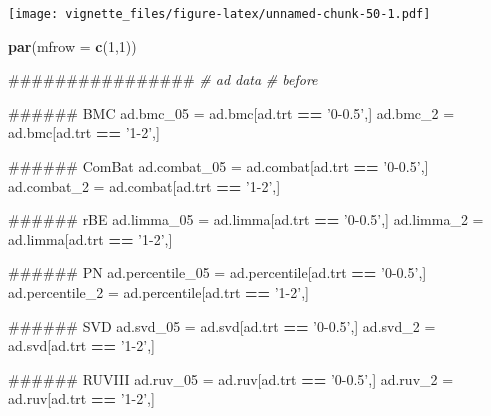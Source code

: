 \documentclass[]{book}
\newenvironment{Shaded}{\begin{snugshade}}{\end{snugshade}}
\newcommand{\KeywordTok}[1]{\textcolor[rgb]{0.13,0.29,0.53}{\textbf{#1}}}
\newcommand{\DataTypeTok}[1]{\textcolor[rgb]{0.13,0.29,0.53}{#1}}
\newcommand{\DecValTok}[1]{\textcolor[rgb]{0.00,0.00,0.81}{#1}}
\newcommand{\StringTok}[1]{\textcolor[rgb]{0.31,0.60,0.02}{#1}}
\newcommand{\CommentTok}[1]{\textcolor[rgb]{0.56,0.35,0.01}{\textit{#1}}}
\newcommand{\OperatorTok}[1]{\textcolor[rgb]{0.81,0.36,0.00}{\textbf{#1}}}
\newcommand{\NormalTok}[1]{#1}
\begin{document}
\texttt{[image: vignette\_files/figure-latex/unnamed-chunk-50-1.pdf]}

\begin{Shaded}
\begin{Highlighting}[]
\KeywordTok{par}\NormalTok{(}\DataTypeTok{mfrow =} \KeywordTok{c}\NormalTok{(}\DecValTok{1}\NormalTok{,}\DecValTok{1}\NormalTok{))}
\end{Highlighting}
\end{Shaded}

\begin{Shaded}
\begin{Highlighting}[]
\NormalTok{################}
\CommentTok{# ad data}
\CommentTok{# before}

\NormalTok{###### BMC}
\NormalTok{ad.bmc_}\DecValTok{05}\NormalTok{ =}\StringTok{ }\NormalTok{ad.bmc[ad.trt }\OperatorTok{==}\StringTok{ '0-0.5'}\NormalTok{,]}
\NormalTok{ad.bmc_}\DecValTok{2}\NormalTok{ =}\StringTok{ }\NormalTok{ad.bmc[ad.trt }\OperatorTok{==}\StringTok{ '1-2'}\NormalTok{,]}

\NormalTok{###### ComBat}
\NormalTok{ad.combat_}\DecValTok{05}\NormalTok{ =}\StringTok{ }\NormalTok{ad.combat[ad.trt }\OperatorTok{==}\StringTok{ '0-0.5'}\NormalTok{,]}
\NormalTok{ad.combat_}\DecValTok{2}\NormalTok{ =}\StringTok{ }\NormalTok{ad.combat[ad.trt }\OperatorTok{==}\StringTok{ '1-2'}\NormalTok{,]}

\NormalTok{###### rBE}
\NormalTok{ad.limma_}\DecValTok{05}\NormalTok{ =}\StringTok{ }\NormalTok{ad.limma[ad.trt }\OperatorTok{==}\StringTok{ '0-0.5'}\NormalTok{,]}
\NormalTok{ad.limma_}\DecValTok{2}\NormalTok{ =}\StringTok{ }\NormalTok{ad.limma[ad.trt }\OperatorTok{==}\StringTok{ '1-2'}\NormalTok{,]}

\NormalTok{###### PN}
\NormalTok{ad.percentile_}\DecValTok{05}\NormalTok{ =}\StringTok{ }\NormalTok{ad.percentile[ad.trt }\OperatorTok{==}\StringTok{ '0-0.5'}\NormalTok{,]}
\NormalTok{ad.percentile_}\DecValTok{2}\NormalTok{ =}\StringTok{ }\NormalTok{ad.percentile[ad.trt }\OperatorTok{==}\StringTok{ '1-2'}\NormalTok{,]}

\NormalTok{###### SVD}
\NormalTok{ad.svd_}\DecValTok{05}\NormalTok{ =}\StringTok{ }\NormalTok{ad.svd[ad.trt }\OperatorTok{==}\StringTok{ '0-0.5'}\NormalTok{,]}
\NormalTok{ad.svd_}\DecValTok{2}\NormalTok{ =}\StringTok{ }\NormalTok{ad.svd[ad.trt }\OperatorTok{==}\StringTok{ '1-2'}\NormalTok{,]}

\NormalTok{###### RUVIII}
\NormalTok{ad.ruv_}\DecValTok{05}\NormalTok{ =}\StringTok{ }\NormalTok{ad.ruv[ad.trt }\OperatorTok{==}\StringTok{ '0-0.5'}\NormalTok{,]}
\NormalTok{ad.ruv_}\DecValTok{2}\NormalTok{ =}\StringTok{ }\NormalTok{ad.ruv[ad.trt }\OperatorTok{==}\StringTok{ '1-2'}\NormalTok{,]}
\end{Highlighting}
\end{Shaded}
\end{document}
